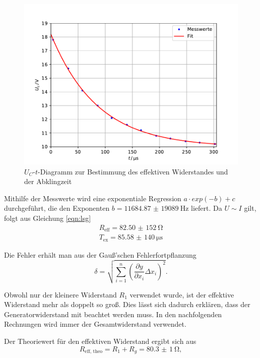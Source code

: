 \begin{figure}[H]
  \centering
  \includegraphics[width=\textwidth]{Plots/effr.pdf}
  \caption{$U_C$-$t$-Diagramm zur Bestimmung des effektiven Widerstandes und der Abklingzeit}
  \label{fig:effr}
\end{figure}

Mithilfe der Messwerte wird eine exponentiale Regression $a \cdot exp(-b) + c$ durchgeführt, die den Exponenten
$b = \SI{11684,87(19089)}{\Hz}$ liefert. Da $U \sim I$ gilt, folgt aus Gleichung \eqref{eqn:lsg}
\begin{align*}
    R_{\text{eff}} = \SI{82,50(152)}{\ohm} \\
    T_{\text{ex}} = \SI{85,58(140)}{\micro \second}
\end{align*}

Die Fehler erhält man aus der Gauß'schen Fehlerfortpflanzung
\begin{equation}
   \delta = \sqrt{ \sum_{i=1}^{n}(\frac{\partial y}{\partial x_i} \Delta x_i)^2}.
   \label{eqn:gaus}
 \end{equation}

Obwohl nur der kleinere Widerstand $R_1$ verwendet wurde, ist der effektive Widerstand
mehr als doppelt so groß. Dies lässt sich dadurch erklären, dass der Generatorwiderstand mit beachtet werden
muss. In den nachfolgenden Rechnungen wird immer der Gesamtwiderstand verwendet.

Der Theoriewert für den effektiven Widerstand ergibt sich aus
\begin{equation*}
  R_{\text{eff, theo}} = R_1 + R_g = \SI{80,3(1)}{\ohm},
\end{equation*}

